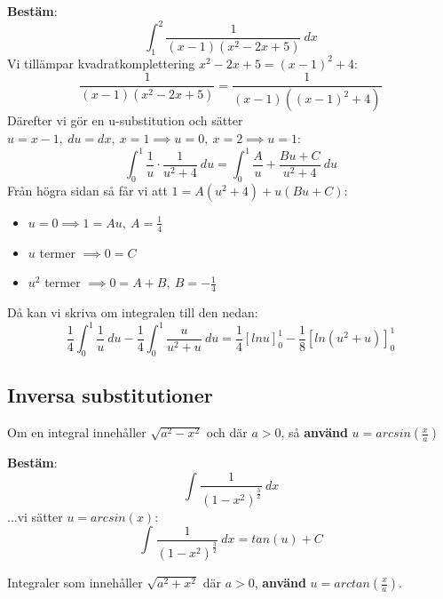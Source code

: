 \documentclass{report}
\begin{document}
\vspace{20pt}
\qs{}
{
\textbf{Bestäm}:
\begin{equation*}
\int_{1}^{2} \frac{1}{(x-1)(x^2-2x+5)}  \: dx 
\end{equation*}
}
\sol Vi tillämpar kvadratkomplettering $ x^2-2x+5 = (x-1)^2 + 4 $:
\begin{equation*}
\frac{1}{(x-1)(x^2-2x+5)} = \frac{1}{(x-1)((x-1)^2+4)} 
\end{equation*}
Därefter vi gör en u-substitution och sätter $ u = x-1,\:du = dx,\: x = 1 \implies u = 0,\: x = 2 \implies u = 1 $:
\begin{equation*}
\int_{0}^{1} \frac{1}{u} \cdot \frac{1}{u^2+4}  \: du = \int_{0}^{1} \frac{A}{u} + \frac{Bu+C}{u^2+4}  \: du  
\end{equation*}
Från högra sidan så får vi att $ 1 = A(u^2+4) + u(Bu+C)$:
\begin{itemize}
	\item $ u =0 \implies 1 = Au,\: A = \frac{1}{4}  $
	\item $ u $  termer $ \implies 0 = C $
	\item $ u^2 $ termer $ \implies 0 = A + B,\:B = -\frac{1}{4}  $  
\end{itemize}
Då kan vi skriva om integralen till den nedan:
\begin{equation*}
	\frac{1}{4}  \int_{0}^{1} \frac{1}{u}  \: du - \frac{1}{4} \int_{0}^{1} \frac{u}{u^2+u}  \: du = \frac{1}{4} [lnu]_{0}^{1} - \frac{1}{8} [ln(u^2+u)]_{0}^{1}   
\end{equation*}

\subsection{Inversa substitutioner}
Om en integral innehåller $ \sqrt{a^2-x^2}  $ och där $ a > 0 $, så \textbf{använd} $ u = arcsin( \frac{x}{a}  ) $

\ex{}
{
\textbf{Bestäm}:
\begin{equation*}
	\int_{}^{} \frac{1}{(1-x^2)^{ \frac{3}{2}  }}  \: dx 
\end{equation*}
...vi sätter $ u = arcsin(x)$:
\begin{equation*}
	\int_{}^{} \frac{1}{(1-x^2)^{ \frac{3}{2}  }}  \: dx = tan(u) + C 
\end{equation*}


}

\vspace{20pt}
\noindent
Integraler som innehåller $ \sqrt{a^2+x^2}  $ där $ a > 0 $, \textbf{använd} $ u = arctan( \frac{x}{a} ) $.
\end{document}
